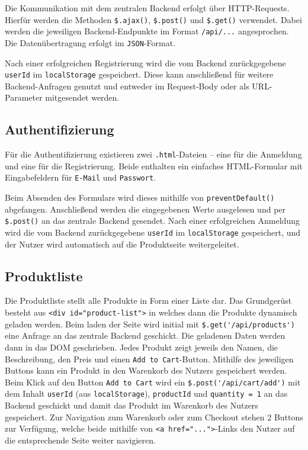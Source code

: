 \documentclass[oneside]{ausarbeitung}
\begin{document}
Die Kommunikation mit dem zentralen Backend erfolgt über HTTP-Requests. Hierfür werden die Methoden \verb|$.ajax()|, \verb|$.post()| und \verb|$.get()| verwendet. Dabei werden die jeweiligen Backend-Endpunkte im Format \texttt{/api/...} angesprochen. Die Datenübertragung erfolgt im \texttt{JSON}-Format.

Nach einer erfolgreichen Registrierung wird die vom Backend zurückgegebene \texttt{userId} im \texttt{localStorage} gespeichert. Diese kann anschließend für weitere Backend-Anfragen genutzt und entweder im Request-Body oder als URL-Parameter mitgesendet werden.

\subsection{Authentifizierung}

Für die Authentifizierung existieren zwei \texttt{.html}-Dateien – eine für die Anmeldung und eine für die Registrierung. Beide enthalten ein einfaches HTML-Formular mit Eingabefeldern für \texttt{E-Mail} und \texttt{Passwort}.

Beim Absenden des Formulars wird dieses mithilfe von \texttt{preventDefault()} abgefangen. Anschließend werden die eingegebenen Werte ausgelesen und per \verb|$.post()| an das zentrale Backend gesendet. Nach einer erfolgreichen Anmeldung wird die vom Backend zurückgegebene \texttt{userId} im \texttt{localStorage} gespeichert, und der Nutzer wird automatisch auf die Produktseite weitergeleitet.

\subsection{Produktliste}

Die Produktliste stellt alle Produkte in Form einer Liste dar. Das Grundgerüst besteht aus \texttt{<div id="product-list">} in welches dann die Produkte dynamisch geladen werden. Beim laden der Seite wird initial mit \verb|$.get('/api/products')| eine Anfrage an das zentrale Backend geschickt. Die geladenen Daten werden dann in das DOM geschrieben. Jedes Produkt zeigt jeweils den Namen, die Beschreibung, den Preis und einen \texttt{Add to Cart}-Button. 
Mithilfe des jeweiligen Buttons kann ein Produkt in den Warenkorb des Nutzers gespeichert werden. Beim Klick auf den Button \texttt{Add to Cart} wird ein \verb|$.post('/api/cart/add')| mit dem Inhalt \texttt{userId} (aus \texttt{localStorage}), \texttt{productId} und \texttt{quantity = 1} an das Backend geschickt und damit das Produkt im Warenkorb des Nutzers gespeichert.
Zur Navigation zum Warenkorb oder zum Checkout stehen 2 Buttons zur Verfügung, welche beide mithilfe von \texttt{<a href="...">}-Links den Nutzer auf die entsprechende Seite weiter navigieren. 
\end{document}
